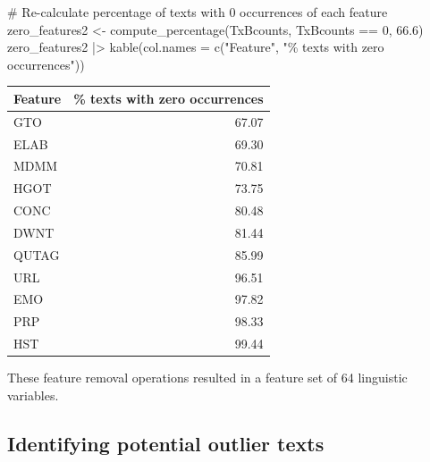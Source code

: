 \documentclass[
  letterpaper,
  DIV=11,
  numbers=noendperiod]{scrreprt}
\newenvironment{Shaded}{\begin{snugshade}}{\end{snugshade}}
\newcommand{\AttributeTok}[1]{\textcolor[rgb]{0.40,0.45,0.13}{#1}}
\newcommand{\CommentTok}[1]{\textcolor[rgb]{0.37,0.37,0.37}{#1}}
\newcommand{\DecValTok}[1]{\textcolor[rgb]{0.68,0.00,0.00}{#1}}
\newcommand{\FloatTok}[1]{\textcolor[rgb]{0.68,0.00,0.00}{#1}}
\newcommand{\FunctionTok}[1]{\textcolor[rgb]{0.28,0.35,0.67}{#1}}
\newcommand{\NormalTok}[1]{\textcolor[rgb]{0.00,0.23,0.31}{#1}}
\newcommand{\OtherTok}[1]{\textcolor[rgb]{0.00,0.23,0.31}{#1}}
\newcommand{\SpecialCharTok}[1]{\textcolor[rgb]{0.37,0.37,0.37}{#1}}
\newcommand{\StringTok}[1]{\textcolor[rgb]{0.13,0.47,0.30}{#1}}
\begin{document}
\begin{Shaded}
\begin{Highlighting}[]
\CommentTok{\# Re{-}calculate percentage of texts with 0 occurrences of each feature}
\NormalTok{zero\_features2 }\OtherTok{\textless{}{-}} \FunctionTok{compute\_percentage}\NormalTok{(TxBcounts, TxBcounts }\SpecialCharTok{==} \DecValTok{0}\NormalTok{, }\FloatTok{66.6}\NormalTok{)}
\NormalTok{zero\_features2 }\SpecialCharTok{|\textgreater{}} 
  \FunctionTok{kable}\NormalTok{(}\AttributeTok{col.names =} \FunctionTok{c}\NormalTok{(}\StringTok{"Feature"}\NormalTok{, }\StringTok{"\% texts with zero occurrences"}\NormalTok{))}
\end{Highlighting}
\end{Shaded}

\begin{longtable}[]{@{}lr@{}}
\toprule\noalign{}
Feature & \% texts with zero occurrences \\
\midrule\noalign{}
\endhead
\bottomrule\noalign{}
\endlastfoot
GTO & 67.07 \\
ELAB & 69.30 \\
MDMM & 70.81 \\
HGOT & 73.75 \\
CONC & 80.48 \\
DWNT & 81.44 \\
QUTAG & 85.99 \\
URL & 96.51 \\
EMO & 97.82 \\
PRP & 98.33 \\
HST & 99.44 \\
\end{longtable}

\begin{Shaded}
\end{Shaded}

These feature removal operations resulted in a feature set of 64
linguistic variables.

\subsection{Identifying potential outlier
texts}\label{identifying-potential-outlier-texts}
\end{document}
